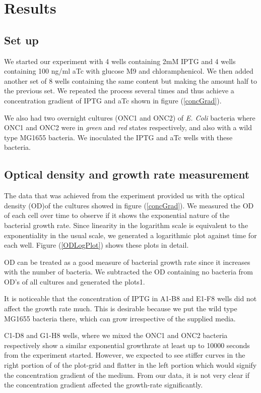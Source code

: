 \documentclass[11pt]{book}
\begin{document}
\chapter{Results}
\section{Set up}
We started our experiment with 4 wells containing 2mM IPTG and 4 wells containing 100 ng/ml aTc with glucose M9 and chloramphenicol. We then added another set of 8 wells containing the same content but making the amount half to the previous set. We repeated the process several times and thus achieve a concentration gradient of IPTG and aTc shown in figure (\ref{concGrad}). 

We also had two overnight cultures (ONC1 and ONC2) of \textit{E. Coli} bacteria where ONC1 and ONC2 were in \textit{green} and \textit{red} states respectively, and also with a wild type MG1655 bacteria. We inoculated the IPTG and aTc wells with these bacteria. 

\section{Optical density and growth rate measurement}
The data that was achieved from the experiment provided us with the optical density (OD)of the cultures showed in figure (\ref{concGrad}). We measured the OD of each cell over time to observe if it shows the exponential nature of the bacterial growth rate. Since linearity in the logarithm scale is equivalent to the  exponentiality in the usual scale, we generated a logarithmic plot against time for each well. Figure (\ref{ODLogPlot}) shows these plots in detail.

OD can be treated as a good measure of bacterial growth rate since it increases with the number of bacteria. We subtracted the OD containing no bacteria from OD's of all cultures and generated the plots1. 

It is noticeable that the concentration of IPTG in A1-B8 and E1-F8 wells did not affect the growth rate much. This is desirable because we put the wild type MG1655 bacteria there, which can grow irrespective of the supplied media. 

C1-D8 and G1-H8 wells, where we mixed the ONC1 and ONC2 bacteria respectively show a similar exponential growthrate at least up to 10000 seconds from the experiment started. However, we expected to see stiffer curves in the right portion of of the plot-grid and flatter in the left portion which would signify the concentration gradient of the medium. From our data, it is not very clear if the concentration gradient affected the growth-rate significantly. 
\end{document}
